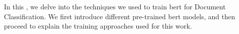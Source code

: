 \label{06_methodology}

In this \headerName{}, we delve into the techniques we used to train \gls{bert} for Document Classification. We first introduce different pre-trained \gls{bert} models, and then proceed to explain the training approaches used for this work.









\clearpage